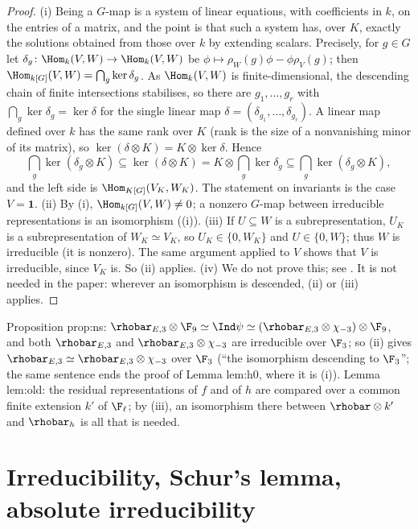 \begin{proof}
(i) Being a $G$-map is a system of linear equations, with coefficients in $k$, on the entries of a matrix, and the point is that
such a system has, over $K$, exactly the solutions obtained from those over $k$ by extending scalars. Precisely, for $g\in G$ let $\delta_g\colon\Hom_k(V,W)\to\Hom_k(V,W)$ be $\phi\mapsto\rho_W(g)\phi-\phi\rho_V(g)$; then $\Hom_{k[G]}(V,W)=\bigcap_g\ker\delta_g$. As
$\Hom_k(V,W)$ is finite-dimensional, the descending chain of finite intersections stabilises, so there are $g_1,\dots,g_r$ with
$\bigcap_g\ker\delta_g=\ker\delta$ for the single linear map $\delta=(\delta_{g_1},\dots,\delta_{g_r})$. A linear map defined over $k$ has the same rank
over $K$ (rank is the size of a nonvanishing minor of its matrix), so $\ker(\delta\otimes K)=K\otimes\ker\delta$. Hence
\[
\textstyle\bigcap_g\ker(\delta_g\otimes K)\subseteq\ker(\delta\otimes K)=K\otimes\bigcap_g\ker\delta_g\subseteq\bigcap_g\ker(\delta_g\otimes K),
\]
and the left side is $\Hom_{K[G]}(V_K,W_K)$. The statement on invariants is the case $V=\mathbf1$.
(ii) By (i), $\Hom_{k[G]}(V,W)\ne0$; a nonzero $G$-map between irreducible representations is an isomorphism ((i)).
(iii) If $U\subseteq W$ is a subrepresentation, $U_K$ is a subrepresentation of $W_K\simeq V_K$, so $U_K\in\{0,W_K\}$ and $U\in\{0,W\}$; thus $W$
is irreducible (it is nonzero). The same argument applied to $V$ shows that $V$ is irreducible, since $V_K$ is. So (ii) applies.
(iv) We do not prove this; see \cite[Section 29]{CurtisReiner}. It is not needed in the paper: wherever an isomorphism is descended,
(ii) or (iii) applies.
\end{proof}

\begin{paperlink}
Proposition prop:ns: $\rhobar_{E,3}\otimes\F_9\simeq\Ind\psi\simeq(\rhobar_{E,3}\otimes\chi_{-3})\otimes\F_9$, and both $\rhobar_{E,3}$ and $\rhobar_{E,3}\otimes\chi_{-3}$ are irreducible
over $\F_3$; so (ii) gives $\rhobar_{E,3}\simeq\rhobar_{E,3}\otimes\chi_{-3}$ over $\F_3$ (``the isomorphism descending to $\F_3$''; the same sentence ends the
proof of Lemma lem:h0, where it is (i)). Lemma lem:old: the residual representations of $f$ and of $h$ are compared over a common finite
extension $k'$ of $\F_\ell$; by (iii), an isomorphism there between $\rhobar\otimes k'$ and $\rhobar_h$ is all that is needed.
\end{paperlink}

\section{Irreducibility, Schur's lemma, absolute irreducibility}\label{sec:reps:irreducible}

